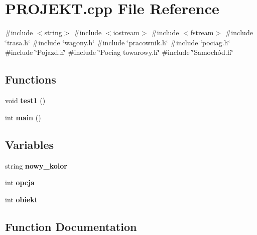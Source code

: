 \section{P\+R\+O\+J\+E\+K\+T.\+cpp File Reference}
\label{_p_r_o_j_e_k_t_8cpp}
{\ttfamily \#include $<$string$>$}\newline
{\ttfamily \#include $<$iostream$>$}\newline
{\ttfamily \#include $<$fstream$>$}\newline
{\ttfamily \#include \char`\"{}trasa.\+h\char`\"{}}\newline
{\ttfamily \#include \char`\"{}wagony.\+h\char`\"{}}\newline
{\ttfamily \#include \char`\"{}pracownik.\+h\char`\"{}}\newline
{\ttfamily \#include \char`\"{}pociag.\+h\char`\"{}}\newline
{\ttfamily \#include \char`\"{}Pojazd.\+h\char`\"{}}\newline
{\ttfamily \#include \char`\"{}Pociag towarowy.\+h\char`\"{}}\newline
{\ttfamily \#include \char`\"{}Samochód.\+h\char`\"{}}\newline
\subsection*{Functions}
\begin{DoxyCompactItemize}
\item 
void \textbf{ test1} ()
\item 
int \textbf{ main} ()
\end{DoxyCompactItemize}
\subsection*{Variables}
\begin{DoxyCompactItemize}
\item 
string \textbf{ nowy\+\_\+kolor}
\item 
int \textbf{ opcja}
\item 
int \textbf{ obiekt}
\end{DoxyCompactItemize}


\subsection{Function Documentation}
\mbox{\label{_p_r_o_j_e_k_t_8cpp_ae66f6b31b5ad750f1fe042a706a4e3d4}} 
